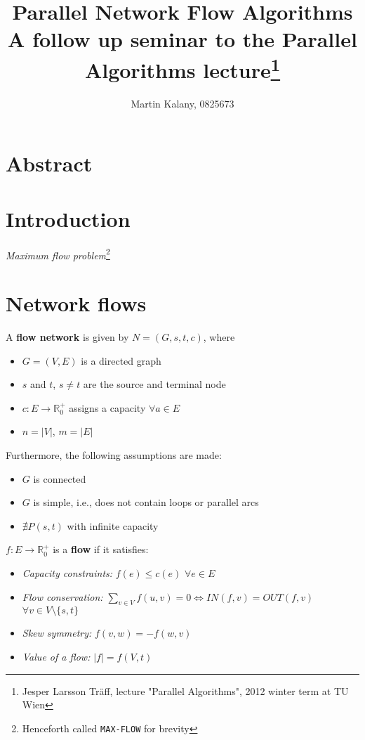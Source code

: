 \documentclass[a4paper,10pt, twocolumn]{article}
\title{Parallel Network Flow Algorithms \\ 
\large A follow up seminar to the Parallel Algorithms lecture\footnote{Jesper Larsson Träff, lecture "Parallel Algorithms", 2012 winter term at TU Wien}}
\author{Martin Kalany, 0825673}
\begin{document}
\maketitle

\section{Abstract}
\label{sec:abstract}

\section{Introduction}
\label{sec:intro}
\emph{Maximum flow problem}\footnote{Henceforth called \lstinline|MAX-FLOW| for brevity}


\section{Network flows}
\label{sec:networkFlows}
A \textbf{flow network} \cite{ahuja93} is given by $N = (G,s,t,c)$, where
\begin{itemize}
	\item $G =(V,E)$ is a directed graph
    \item $s$ and $t$, $s \neq t$ are the source and terminal node
   	\item $c:E\rightarrow \mathbb{R}_0^{+}$ assigns a capacity $\forall a \in E$
   	\item $n=\lvert V\rvert$, $m=\lvert E\rvert$
\end{itemize}

Furthermore, the following assumptions are made:
\begin{itemize}
	\item $G$ is connected
	\item $G$ is simple, i.e., does not contain loops or parallel arcs
	\item $\nexists P(s,t)$ with infinite capacity
\end{itemize}

\medskip
$f:E \rightarrow \mathbb{R}_0^{+}$ is a \textbf{flow} if it satisfies:
\begin{itemize}
	\item \emph{Capacity constraints:} $f(e) \leq c(e)$ $\forall e \in E$
	\item \emph{Flow conservation:} 
	$ \sum\limits_{v \in V} f(u,v) =  0 \Leftrightarrow IN(f,v) = OUT(f,v)$ $\forall v \in V \setminus \{s,t\}$
	\item \emph{Skew symmetry:} $f(v,w) = -f(w,v)$
	\item \emph{Value of a flow:} $\lvert f\rvert = f(V,t)$ 
\end{itemize}
\end{document}
